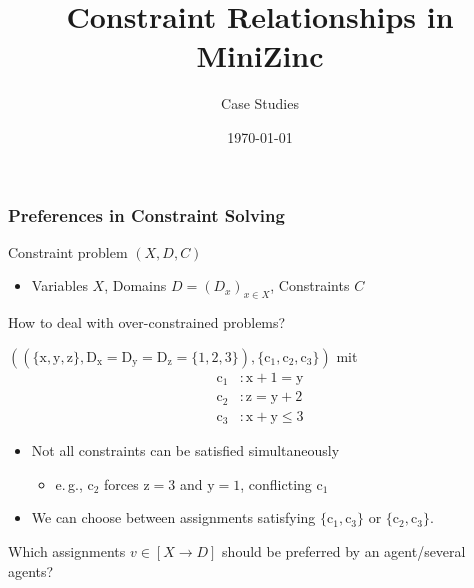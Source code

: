 \documentclass[10pt,xcolor={dvipsnames},fleqn]{beamer}
\title{Constraint Relationships in MiniZinc}
\author{Case Studies}
\date{\today}
\newcommand{\cemph}[1]{\alert{#1}}
\begin{document}
\titleframe


\begin{frame}
\frametitle{Preferences in Constraint Solving}

Constraint problem $(X, D, C)$ 
\begin{itemize}
  \item \cemph{Variables} $X$,
\cemph{Domains} $D = (D_x)_{x \in X}$,
\cemph{Constraints} $C$
\end{itemize}

\vspace*{1ex}

How to deal with \cemph{over-constrained} problems?

\vspace*{2ex}

$((\{ \mathrm{x}, \mathrm{y}, \mathrm{z} \},
\mathrm{D}_{\mathrm{x}} = \mathrm{D}_{\mathrm{y}} =
\mathrm{D}_{\mathrm{z}} = \{ 1, 2, 3 \}), \{ \mathrm{c}_1,
\mathrm{c}_2, \mathrm{c}_3 \})$ mit 
\bgroup{}
\begin{align*}
  \mathrm{c}_1 &: \mathrm{x} + 1 = \mathrm{y}
\\[-.4ex]
  \mathrm{c}_2 &: \mathrm{z} = \mathrm{y} + 2
\\[-.4ex]
  \mathrm{c}_3 &: \mathrm{x} + \mathrm{y} \leq 3
\end{align*}
\egroup

\begin{itemize}
  \item Not all constraints can be satisfied simultaneously
\begin{itemize} \pause
  \item e.\,g., $\mathrm{c}_2$ forces $\mathrm{z} = 3$ and $\mathrm{y} = 1$, conflicting $\mathrm{c}_1$
\end{itemize}

  \item We can \cemph{choose} between assignments satisfying $\{ \mathrm{c}_1, \mathrm{c}_3 \}$ or $\{ \mathrm{c}_2, \mathrm{c}_3 \}$.
\end{itemize}

\vspace*{2ex}

Which assignments $v \in [X \to D]$ should be \alert{preferred} by an agent/several agents?

\end{frame}
\end{document}
